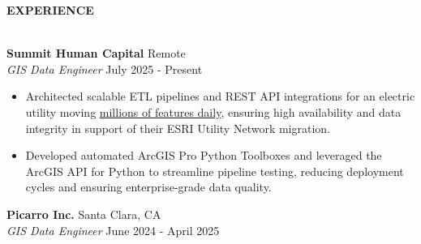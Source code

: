 \documentclass[letterpaper]{article}
\newcommand{\lineunder} {
        \vspace*{-8pt} \\
        \hspace*{-18pt} \hrulefill \\
    }
\newcommand{\header} [1] {
        \vspace{9pt}
        {\hspace*{-18pt}\vspace*{6pt} \large \textbf {#1}}
        \vspace*{-6pt} \lineunder
        \vspace{2pt}
    }
\newcommand{\employer}[4]{
        \vspace{3pt}
        \textbf{#1}  %
        \hfill #2\\  %
        \textit{#3}  %
        \hfill #4\\  %
        \vspace{3mm}
    }
\newenvironment{jobtasklist}
        {
            \vspace{-12pt}
            \begin{itemize} \itemsep 0pt
        }{
            \end{itemize}
            \vspace{-3pt}
        }
\newcommand{\impt}[1]{\uline{#1}}
\begin{document}
\header{EXPERIENCE}



\employer
    {Summit Human Capital}
    {Remote}
    {GIS Data Engineer}
    {July 2025 - Present}

\begin{jobtasklist}
    \item Architected scalable ETL pipelines and REST API integrations for an electric utility
            moving \impt{millions of features daily}, ensuring high availability and data integrity
            in support of their ESRI Utility Network migration.
    \item Developed automated ArcGIS Pro Python Toolboxes and leveraged the ArcGIS API for Python
            to streamline pipeline testing, reducing deployment cycles and ensuring enterprise-grade data quality.
\end{jobtasklist}

\employer
    {Picarro Inc.}
    {Santa Clara, CA}
    {GIS Data Engineer}
    {June 2024 - April 2025}
\end{document}
